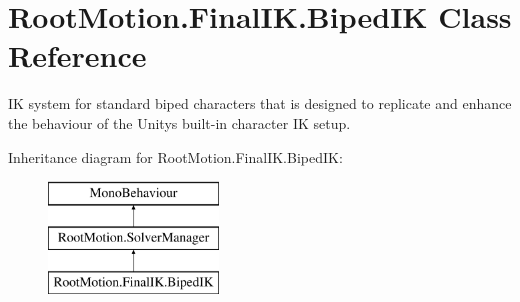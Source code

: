 \hypertarget{class_root_motion_1_1_final_i_k_1_1_biped_i_k}{}\section{Root\+Motion.\+Final\+I\+K.\+Biped\+IK Class Reference}
\label{class_root_motion_1_1_final_i_k_1_1_biped_i_k}


IK system for standard biped characters that is designed to replicate and enhance the behaviour of the Unity\textquotesingle{}s built-\/in character IK setup.  


Inheritance diagram for Root\+Motion.\+Final\+I\+K.\+Biped\+IK\+:\begin{figure}[H]
\begin{center}
\leavevmode
\includegraphics[height=3.000000cm]{class_root_motion_1_1_final_i_k_1_1_biped_i_k}
\end{center}
\end{figure}
